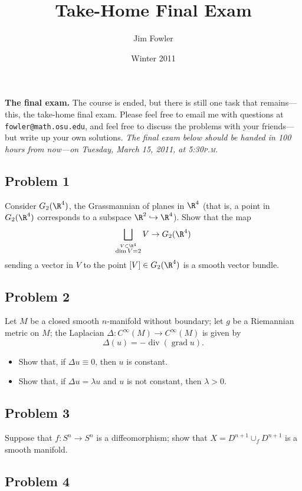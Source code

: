 \documentclass[12pt]{handout}
\title{Take-Home Final Exam}
\author{Jim Fowler}
\date{Winter 2011}
\DeclareMathOperator{\Div}{div}
\DeclareMathOperator{\grad}{grad}
\begin{document}
\maketitle

\noindent\textbf{The final exam.}  The course is ended, but there is
still one task that remains---this, the take-home final exam.  Please
feel free to email me with questions at \texttt{fowler@math.osu.edu},
and feel free to discuss the problems with your friends---but write up
your own solutions.
\textit{The final exam below should be handed in 100 hours from now---on Tuesday, March 15,
  2011, at 5:30\textsc{p.m.}}

\subsection*{Problem 1}

Consider $G_2(\R^4)$, the Grassmannian of planes in $\R^4$ (that is, a
point in $G_2(\R^4)$ corresponds to a subspace $\R^2 \hookrightarrow
\R^4$).  Show that the map
$$
\bigsqcup_{\stackrel{V \subset \R^4}{\dim V = 2}} V \to G_2(\R^4)
$$
sending a vector in $V$ to the point $[V] \in G_2(\R^4)$ is a smooth
vector bundle.

\subsection*{Problem 2}

Let $M$ be a closed smooth $n$-manifold without boundary; let $g$ be a
Riemannian metric on $M$; the Laplacian $\Delta : C^\infty(M) \to
C^\infty(M)$ is given by
$$
\Delta(u) = -\Div(\grad u).
$$
\begin{itemize}
\item Show that, if $\Delta u \equiv 0$, then $u$ is constant.
\item Show that, if $\Delta u = \lambda u$ and $u$ is not constant, then $\lambda > 0$.
\end{itemize}

\subsection*{Problem 3}

Suppose that $f : S^n \to S^n$ is a diffeomorphism; show that $X =
D^{n+1} \cup_f D^{n+1}$ is a smooth manifold.

\subsection*{Problem 4}
\end{document}
